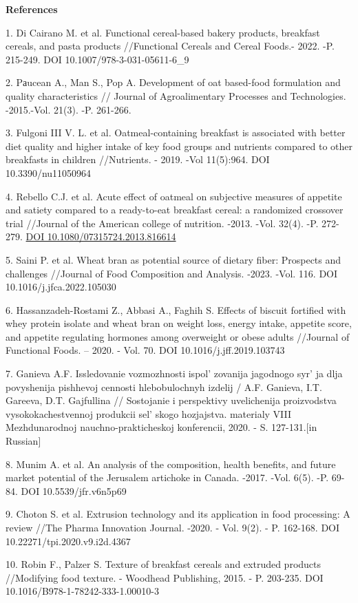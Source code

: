 \begin{center}
{\bfseries References}
\end{center}

\begin{references}
1. Di Cairano M. et al. Functional cereal-based bakery products,
breakfast cereals, and pasta products //Functional Cereals and Cereal
Foods.- 2022. -P. 215-249. DOI 10.1007/978-3-031-05611-6\_9

2. Pаucean A., Man S., Pop A. Development of oat based-food formulation
and quality characteristics // Journal of Agroalimentary Processes and
Technologies. -2015.-Vol. 21(3). -P. 261-266.

3. Fulgoni III V. L. et al. Oatmeal-containing breakfast is associated
with better diet quality and higher intake of key food groups and
nutrients compared to other breakfasts in children //Nutrients. - 2019.
-Vol 11(5):964. DOI 10.3390/nu11050964

4. Rebello C.J. et al. Acute effect of oatmeal on subjective measures of
appetite and satiety compared to a ready-to-eat breakfast cereal: a
randomized crossover trial //Journal of the American college of
nutrition. -2013. -Vol. 32(4). -P. 272-279.
\href{https://doi.org/10.1080/07315724.2013.816614}{DOI
10.1080/07315724.2013.816614}

5. Saini P. et al. Wheat bran as potential source of dietary fiber:
Prospects and challenges //Journal of Food Composition and Analysis.
-2023. -Vol. 116. DOI 10.1016/j.jfca.2022.105030

6. Hassanzadeh-Rostami Z., Abbasi A., Faghih S. Effects of biscuit
fortified with whey protein isolate and wheat bran on weight loss,
energy intake, appetite score, and appetite regulating hormones among
overweight or obese adults //Journal of Functional Foods. -- 2020. -
Vol. 70. DOI 10.1016/j.jff.2019.103743

7. Ganieva A.F. Issledovanie vozmozhnosti ispol' zovanija
jagodnogo syr' ja dlja povyshenija pishhevoj cennosti
hlebobulochnyh izdelij / A.F. Ganieva, I.T. Gareeva, D.T. Gajfullina //
Sostojanie i perspektivy uvelichenija proizvodstva vysokokachestvennoj
produkcii sel' skogo hozjajstva. materialy VIII\\
Mezhdunarodnoj nauchno-prakticheskoj konferencii, 2020. - S.
127-131.{[}in Russian{]}

8. Munim A. et al. An analysis of the composition, health benefits, and
future market potential of the Jerusalem artichoke in Canada. -2017.
-Vol. 6(5). -P. 69-84. DOI 10.5539/jfr.v6n5p69

9. Choton S. et al. Extrusion technology and its application in food
processing: A review //The Pharma Innovation Journal. -2020. - Vol.
9(2). - P. 162-168. DOI 10.22271/tpi.2020.v9.i2d.4367

10. Robin F., Palzer S. Texture of breakfast cereals and extruded
products //Modifying food texture. - Woodhead Publishing, 2015. - P.
203-235. DOI 10.1016/B978-1-78242-333-1.00010-3
\end{references}

